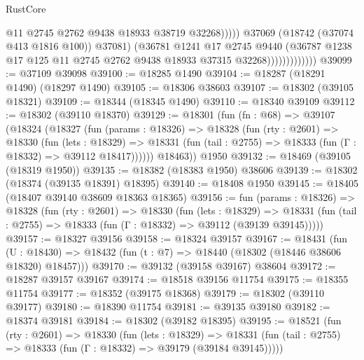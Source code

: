 \begin{lexlean}{RustCore}
\begin{coremodule}
                                      @11
                                      @2745
                                      @2762
                                      @9438
                                      @18933
                                      @38719
                                      @32268)))))
                            @37069
                            (@18742 (@37074 @413 @1816 @100))
                            @37081)
                          (@36781
                            @1241
                            @17
                            @2745
                            @9440
                            (@36787
                              @1238
                              @17
                              @125
                              @11
                              @2745
                              @2762
                              @9438
                              @18933
                              @37315
                              @32268)))))))))))))
@39099 := @37109 @39098
@39100 := @18285 @1490
@39104 := @18287 (@18291 @1490) (@18297 @1490)
@39105 := @18306 @38603
@39107 := @18302 (@39105 @18321)
@39109 := @18344 (@18345 @1490)
@39110 := @18340 @39109
@39112 := @18302 (@39110 @18370)
@39129 := @18301
    (fun (fn : @68) =>
    @39107
      (@18324
        (@18327
          (fun (params : @18326) =>
          @18328
            (fun (rty : @2601) =>
            @18330
              (fun (lets : @18329) =>
              @18331 (fun (tail : @2755) => @18333 (fun (Γ : @18332) => @39112 @18417))))))
        @18463))
    @1950
@39132 := @18469 (@39105 (@18319 @1950))
@39135 := @18382 (@18383 @1950) @38606
@39139 := @18302 (@18374 (@39135 @18391) @18395)
@39140 := @18408 @1950
@39145 := @18405 (@18407 @39140 @38609 @18363 @18365)
@39156 := fun (params : @18326) =>
  @18328
    (fun (rty : @2601) =>
    @18330
      (fun (lets : @18329) =>
      @18331 (fun (tail : @2755) => @18333 (fun (Γ : @18332) => @39112 (@39139 @39145)))))
@39157 := @18327 @39156
@39158 := @18324 @39157
@39167 := @18431
    (fun (U : @18430) => @18432 (fun (t : @7) => @18440 (@18302 (@18446 @38606 @18320) @18457)))
@39170 := @39132 (@39158 @39167) @38604
@39172 := @18287 @39157 @39167
@39174 := @18518 @39156 @11754
@39175 := @18355 @11754
@39177 := @18352 (@39175 @18368)
@39179 := @18302 (@39110 @39177)
@39180 := @18390 @11754
@39181 := @39135 @39180
@39182 := @18374 @39181
@39184 := @18302 (@39182 @18395)
@39195 := @18521
    (fun (rty : @2601) =>
    @18330
      (fun (lets : @18329) =>
      @18331 (fun (tail : @2755) => @18333 (fun (Γ : @18332) => @39179 (@39184 @39145)))))

\end{coremodule}
\end{lexlean}
